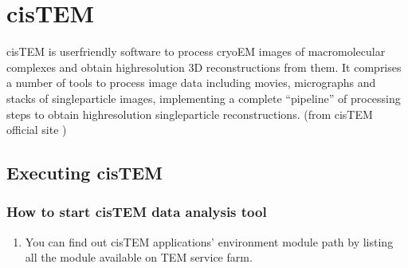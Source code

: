 \documentclass[a4paper,10pt,english]{sphinxmanual}
\begin{document}


\sphinxstepscope


\chapter{cisTEM}
\label{\detokenize{cisTEM:cistem}}\label{\detokenize{cisTEM::doc}}
\sphinxAtStartPar
cisTEM is user\sphinxhyphen{}friendly software to process cryo\sphinxhyphen{}EM images of macromolecular complexes and obtain high\sphinxhyphen{}resolution 3D reconstructions from them. It comprises a number of tools to process image data including movies, micrographs and stacks of single\sphinxhyphen{}particle images, implementing a complete “pipeline” of processing steps to obtain high\sphinxhyphen{}resolution single\sphinxhyphen{}particle reconstructions. (from cisTEM official site )


\section{Executing cisTEM}
\label{\detokenize{cisTEM:executing-cistem}}

\subsection{How to start cisTEM data analysis tool}
\label{\detokenize{cisTEM:how-to-start-cistem-data-analysis-tool}}\begin{enumerate}
%
\item {} 
\sphinxAtStartPar
You can find out cisTEM applications’ environment module path by listing all the module available on TEM service farm.

\end{enumerate}
\end{document}

